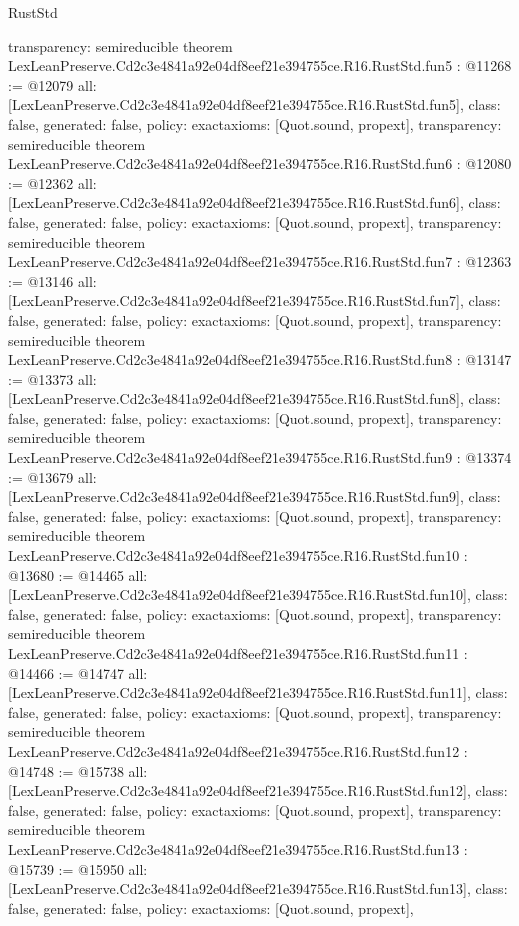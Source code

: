 \begin{lexlean}{RustStd}
\begin{coremodule}
{  transparency: semireducible
}
theorem LexLeanPreserve.Cd2c3e4841a92e04df8eef21e394755ce.R16.RustStd.fun5 : @11268 := @12079 {
  all: [LexLeanPreserve.Cd2c3e4841a92e04df8eef21e394755ce.R16.RustStd.fun5],
  class: false,
  generated: false,
  policy: exact{axioms: [Quot.sound, propext]},
  transparency: semireducible
}
theorem LexLeanPreserve.Cd2c3e4841a92e04df8eef21e394755ce.R16.RustStd.fun6 : @12080 := @12362 {
  all: [LexLeanPreserve.Cd2c3e4841a92e04df8eef21e394755ce.R16.RustStd.fun6],
  class: false,
  generated: false,
  policy: exact{axioms: [Quot.sound, propext]},
  transparency: semireducible
}
theorem LexLeanPreserve.Cd2c3e4841a92e04df8eef21e394755ce.R16.RustStd.fun7 : @12363 := @13146 {
  all: [LexLeanPreserve.Cd2c3e4841a92e04df8eef21e394755ce.R16.RustStd.fun7],
  class: false,
  generated: false,
  policy: exact{axioms: [Quot.sound, propext]},
  transparency: semireducible
}
theorem LexLeanPreserve.Cd2c3e4841a92e04df8eef21e394755ce.R16.RustStd.fun8 : @13147 := @13373 {
  all: [LexLeanPreserve.Cd2c3e4841a92e04df8eef21e394755ce.R16.RustStd.fun8],
  class: false,
  generated: false,
  policy: exact{axioms: [Quot.sound, propext]},
  transparency: semireducible
}
theorem LexLeanPreserve.Cd2c3e4841a92e04df8eef21e394755ce.R16.RustStd.fun9 : @13374 := @13679 {
  all: [LexLeanPreserve.Cd2c3e4841a92e04df8eef21e394755ce.R16.RustStd.fun9],
  class: false,
  generated: false,
  policy: exact{axioms: [Quot.sound, propext]},
  transparency: semireducible
}
theorem LexLeanPreserve.Cd2c3e4841a92e04df8eef21e394755ce.R16.RustStd.fun10 : @13680 := @14465 {
  all: [LexLeanPreserve.Cd2c3e4841a92e04df8eef21e394755ce.R16.RustStd.fun10],
  class: false,
  generated: false,
  policy: exact{axioms: [Quot.sound, propext]},
  transparency: semireducible
}
theorem LexLeanPreserve.Cd2c3e4841a92e04df8eef21e394755ce.R16.RustStd.fun11 : @14466 := @14747 {
  all: [LexLeanPreserve.Cd2c3e4841a92e04df8eef21e394755ce.R16.RustStd.fun11],
  class: false,
  generated: false,
  policy: exact{axioms: [Quot.sound, propext]},
  transparency: semireducible
}
theorem LexLeanPreserve.Cd2c3e4841a92e04df8eef21e394755ce.R16.RustStd.fun12 : @14748 := @15738 {
  all: [LexLeanPreserve.Cd2c3e4841a92e04df8eef21e394755ce.R16.RustStd.fun12],
  class: false,
  generated: false,
  policy: exact{axioms: [Quot.sound, propext]},
  transparency: semireducible
}
theorem LexLeanPreserve.Cd2c3e4841a92e04df8eef21e394755ce.R16.RustStd.fun13 : @15739 := @15950 {
  all: [LexLeanPreserve.Cd2c3e4841a92e04df8eef21e394755ce.R16.RustStd.fun13],
  class: false,
  generated: false,
  policy: exact{axioms: [Quot.sound, propext]},
}
\end{coremodule}
\end{lexlean}
